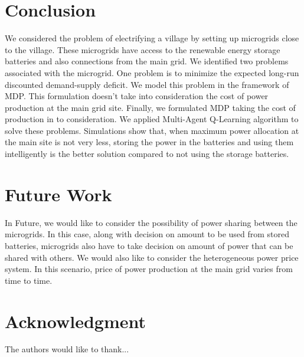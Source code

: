 \documentclass[conference]{IEEEtran}
\begin{document}
\section{Conclusion}
We considered the problem of electrifying a village by setting up microgrids close to the village. These microgrids have access to the renewable energy storage batteries and also connections from the main grid. We identified two problems associated with the microgrid. One problem is to minimize the expected long-run discounted demand-supply deficit. We model this problem in the framework of MDP. This formulation doesn't take into consideration the cost of power production at the main grid site. Finally, we formulated MDP taking the cost of production in to consideration. We applied Multi-Agent Q-Learning algorithm to solve these problems. Simulations show that, when maximum power allocation at the main site is not very less, storing the power in the batteries and using them intelligently is the better solution compared to not using the storage batteries. 

\section{Future Work}
In Future, we would like to consider the possibility of power sharing between the microgrids. In this case, along with decision on amount to be used from stored batteries, microgrids also have to take decision on amount of power that can be shared with others. We would also like to consider the  heterogeneous power price system. In this scenario, price of power production at the main grid varies from time to time. 



\section*{Acknowledgment}


The authors would like to thank...


 
 




\end{document}
